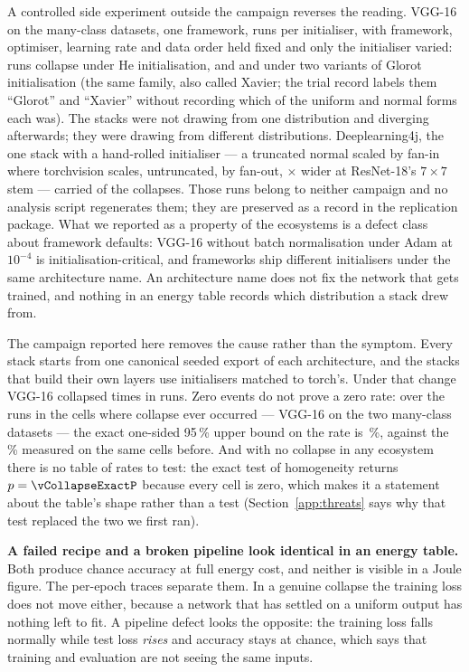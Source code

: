A controlled side experiment outside the campaign reverses the reading. VGG-16
on the many-class datasets, one framework, \vInitCollapseTrials{} runs per
initialiser, with framework, optimiser, learning rate and data order held
fixed and only the initialiser varied: \vInitCollapseHe{} runs collapse under
He initialisation, and \vInitCollapseGlorot{} and \vInitCollapseXavier{} under
two variants of Glorot initialisation (the same family, also called Xavier;
the trial record labels them ``Glorot'' and ``Xavier'' without recording which
of the uniform and normal forms each was). The stacks were not drawing from one
distribution and diverging afterwards; they were drawing from different
distributions. Deeplearning4j, the one stack with a hand-rolled initialiser
--- a truncated normal scaled by fan-in where torchvision scales, untruncated,
by fan-out, \vInitStemWidthRatioJava$\times$ wider at ResNet-18's $7\times7$
stem --- carried \vCollapseFirstJava{} of the \vCollapseFirstVgg{} collapses.
Those runs belong to neither campaign and no analysis script regenerates them;
they are preserved as a record in the replication package. What we reported as
a property of the ecosystems is a defect class about framework defaults:
VGG-16 without batch normalisation under Adam at $10^{-4}$ is
initialisation-critical, and frameworks ship different initialisers under the
same architecture name. An architecture name does not fix the network that gets
trained, and nothing in an energy table records which distribution a stack
drew from.

The campaign reported here removes the cause rather than the symptom. Every
stack starts from one canonical seeded export of each architecture, and the
stacks that build their own layers use initialisers matched to torch's. Under
that change VGG-16 collapsed \vCollapseRuns{} times in \vCollapsedVggRuns{}
runs. Zero events do not prove a zero rate: over the
\vCollapseSusceptibleRuns{} runs in the cells where collapse ever occurred ---
VGG-16 on the two many-class datasets --- the exact one-sided 95\,\% upper
bound on the rate is \vCollapseRateUpperNinetyFive\,\%, against the
\vCollapseFirstRateOverall\,\% measured on the same cells before. And with no
collapse in any ecosystem there is no table of rates to test: the exact test
of homogeneity returns $p = \vCollapseExactP$ because every cell is zero,
which makes it a statement about the table's shape rather than a test
(Section~\ref{app:threats} says why that test replaced the two we first ran).

\textbf{A failed recipe and a broken pipeline look identical in an energy
table.} Both produce chance accuracy at full energy cost, and neither is visible
in a Joule figure. The per-epoch traces separate them. In a genuine collapse the
training loss does not move either, because a network that has settled on a
uniform output has nothing left to fit. A pipeline defect looks the opposite:
the training loss falls normally while test loss \emph{rises} and accuracy stays
at chance, which says that training and evaluation are not seeing the same
inputs.

